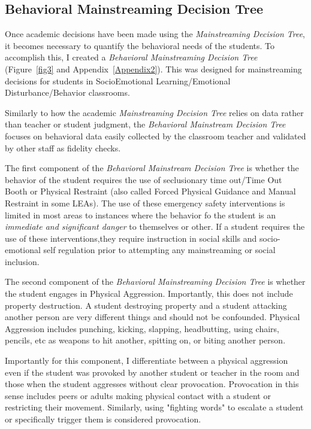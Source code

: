 \documentclass[twoside]{article}
\begin{document}
\subsection{Behavioral Mainstreaming Decision Tree}
Once academic decisions have been made using the \textit{Mainstreaming Decision Tree}, it becomes necessary to quantify the behavioral needs of the students. To accomplish this, I created a \textit{Behavioral Mainstreaming Decision Tree} (Figure~\ref{fig3} and Appendix~\ref{Appendix2}). This was designed for mainstreaming decisions for students in SocioEmotional Learning/Emotional Disturbance/Behavior classrooms. 

Similarly to how the academic \textit{Mainstreaming Decision Tree} relies on data rather than teacher or student judgment, the\textit{ Behavioral Mainstream Decision Tree} focuses on behavioral data easily collected by the classroom teacher and validated by other staff as fidelity checks. 

The first component of the \textit{Behavioral Mainstream Decision Tree} is whether the behavior of the student requires the use of seclusionary time out/Time Out Booth or Physical Restraint (also called Forced Physical Guidance and Manual Restraint in some LEAs). The use of these emergency safety interventions is limited in most areas to instances where the behavior fo the student is an \textit{immediate and significant danger} to themselves or other. If a student requires the use of these interventions,they require instruction in social skills and socio-emotional self regulation prior to attempting any mainstreaming or social inclusion. 

The second component of the \textit{Behavioral Mainstreaming Decision Tree} is whether the student engages in Physical Aggression. Importantly, this does not include property destruction. A student destroying property and a student attacking another person are very different things and should not be confounded. Physical Aggression includes punching, kicking, slapping, headbutting, using chairs, pencils, etc as weapons to hit another, spitting on, or biting another person. 

Importantly for this component, I differentiate between a physical aggression even if the student was provoked by another student or teacher in the room and those when the student aggresses without clear provocation. Provocation in this sense includes peers or adults making physical contact with a student or restricting their movement. Similarly, using "fighting words" to escalate a student or specifically trigger them is considered provocation. 
\end{document}
